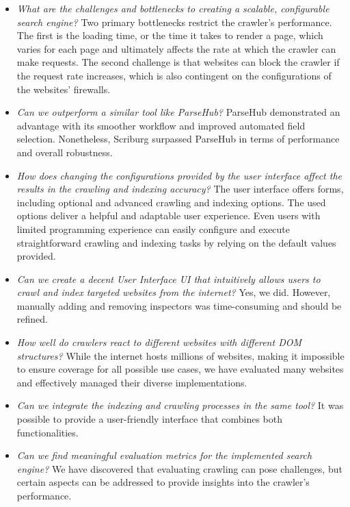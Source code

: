\begin{itemize}
  \item \textit{What are the challenges and bottlenecks to creating a scalable, configurable search engine?}
Two primary bottlenecks restrict the crawler's performance. The first is the loading time, or the time it takes to render a page, which varies for each page and ultimately affects the rate at which the crawler can make requests. The second challenge is that websites can block the crawler if the request rate increases, which is also contingent on the configurations of the websites' firewalls.

\item \textit{Can we outperform a similar tool like ParseHub?}
ParseHub demonstrated an advantage with its smoother workflow and improved automated field selection. Nonetheless, Scriburg surpassed ParseHub in terms of performance and overall robustness.

\item \textit{How does changing the configurations provided by the user interface affect the results in the crawling and indexing accuracy?} The user interface offers forms, including optional and advanced crawling and indexing options. The used options deliver a helpful and adaptable user experience. Even users with limited programming experience can easily configure and execute straightforward crawling and indexing tasks by relying on the default values provided.

    \item \textit{Can we create a decent User Interface UI that intuitively allows users to crawl and index targeted websites from the internet?} Yes, we did. However, manually adding and removing inspectors was time-consuming and should be refined.
    
\item \textit{How well do crawlers react to different websites with different DOM structures?} While the internet hosts millions of websites, making it impossible to ensure coverage for all possible use cases, we have evaluated many websites and effectively managed their diverse implementations.

    \item \textit{Can we integrate the indexing and crawling processes in the same tool?} It was possible to provide a user-friendly interface that combines both functionalities.
    
    \item \textit{Can we find meaningful evaluation metrics for the implemented search engine?} We have discovered that evaluating crawling can pose challenges, but certain aspects can be addressed to provide insights into the crawler's performance.
    
\end{itemize}

